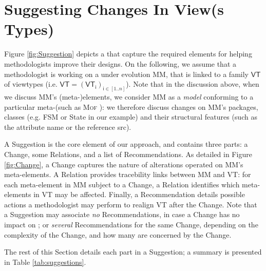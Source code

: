 \section{Suggesting Changes In View(s Types)}
\label{sec:Suggestion}

Figure \ref{fig:Suggestion} depicts a \metamodel that capture the
required elements for helping methodologists improve their designs.
On the following, we assume that a methodologist is working on a \metamodel
under evolution \textsf{MM}, that is linked to a family $\mathsf{VT}$ of viewtypes
(i.e. $\mathsf{VT} = (\mathsf{VT}_\mathsf{i})_{\mathsf{i}\in [1..n]}$). Note that in the discussion above, when we discuss
\textsf{MM}'s (meta-)elements, we consider \textsf{MM} as a \emph{model}
conforming to a particular meta-\metamodel (such as \textsc{Mof} \cite{TR:OMG-MOF:2016}):
we therefore discuss changes on \textsf{MM}'s packages, classes (e.g. 
\textsf{FSM} or \textsf{State} in our example) and their structural features
(such as the attribute \textsf{name} or the reference \textsf{src}).

A \textsf{Suggestion} is the core element of our approach, and contains three 
parts: a \textsf{Change}, some \textsf{Relation}s, and a list of 
\textsf{Recommendation}s. 
%
As detailed in Figure \ref{fig:Change}, a \textsf{Change} captures the nature of
alterations operated on \textsf{MM}'s meta-elements. 
A \textsf{Relation} provides tracebility links between \textsf{MM} and \textsf{VT}:
for each meta-element in \textsf{MM} subject to a \textsf{Change}, a \textsf{Relation}
identifies which meta-elements in \textsf{VT} may be affected. 
Finally, a \textsf{Recommendation} details possible actions a methodologist may 
perform to realign \textsf{VT} after the \textsf{Change}. 
Note that a \textsf{Suggestion} may 
associate \emph{no} \textsf{Recommendation}s, in case a \textsf{Change} has no
impact on \viewtypes; or \emph{several} \textsf{Recommendation}s for the same 
\textsf{Change}, depending on the complexity of the \textsf{Change}, and how 
many \viewtypes are concerned by the \textsf{Change}.

The rest of this Section details each part in a \textsf{Suggestion}; a summary
is presented in Table \ref{tab:suggestions}.






